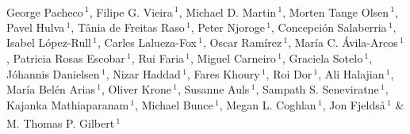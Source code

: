 \documentclass[twoside, british, a4paper]{article}
\begin{document}
\thispagestyle{empty}

\LARGE{\bfseries{\color[rgb]{0.25,0.25,0.25}}} \\

\begin{lstlisting}
\end{lstlisting}

 \small \noindent 
George Pacheco\,$^{1}$\textsuperscript{\faEnvelopeO},
Filipe G. Vieira\,$^{1}$,
Michael D. Martin\,$^{1}$,
Morten Tange Olsen\,$^{1}$,
Pavel Hulva\,$^{1}$,
Tânia de Freitas Raso\,$^{1}$,
Peter Njoroge\,$^{1}$,
Concepción Salaberria\,$^{1}$,
Isabel López-Rull\,$^{1}$,
Carles Lalueza-Fox\,$^{1}$,
Oscar Ramírez\,$^{1}$,
María C. Ávila-Arcos\,$^{1}$,
Patricia Rosas Escobar\,$^{1}$,
Rui Faria\,$^{1}$,
Miguel Carneiro\,$^{1}$,
Graciela Sotelo\,$^{1}$,
Jóhannis Danielsen\,$^{1}$,
Nizar Haddad\,$^{1}$,
Fares Khoury\,$^{1}$,
Roi Dor\,$^{1}$,
Ali Halajian\,$^{1}$,
María Belén Arias\,$^{1}$,
Oliver Krone\,$^{1}$,
Susanne Auls\,$^{1}$,
Sampath S. Seneviratne\,$^{1}$,
Kajanka Mathiaparanam\,$^{1}$,
Michael Bunce\,$^{1}$,
Megan L. Coghlan\,$^{1}$,
Jon Fjeldså\,$^{1}$ \&
M. Thomas P. Gilbert\,$^{1}$\textsuperscript{\faEnvelopeO}

\hfill\break
\hfill\break
\hfill\break
\end{document}
